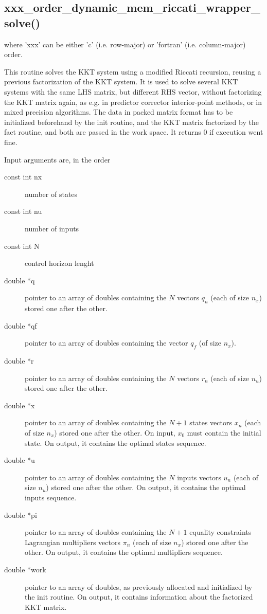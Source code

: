 \documentclass[a4paper]{report}
\begin{document}
\subsection{xxx\_order\_dynamic\_mem\_riccati\_wrapper\_solve() } 
where 'xxx' can be either 'c' (i.e. row-major) or 'fortran' (i.e. column-major) order.

This routine solves the KKT system using a modified Riccati recursion, reusing a previous factorization of the KKT system.
It is used to solve several KKT systems with the same LHS matrix, but different RHS vector, without factorizing the KKT matrix again, as e.g. in predictor corrector interior-point methods, or in mixed precision algorithms.
The data in packed matrix format has to be initialized beforehand by the init routine, and the KKT matrix factorized by the fact routine, and both are passed in the work space.
It returns 0 if execution went fine.

Input arguments are, in the order
\begin{description}
\item[const int nx] number of states
\item[const int nu] number of inputs
\item[const int N] control horizon lenght
\item[double *q] pointer to an array of doubles containing the $N$ vectors $q_n$ (each of size $n_x$) stored one after the other.
\item[double *qf] pointer to an array of doubles containing the vector $q_f$ (of size $n_x$).
\item[double *r] pointer to an array of doubles containing the $N$ vectors $r_n$ (each of size $n_u$) stored one after the other.
\item[double *x] pointer to an array of doubles containing the $N+1$ states vectors $x_n$ (each of size $n_x$) stored one after the other. On input, $x_0$ must contain the initial state. On output, it contains the optimal states sequence.
\item[double *u] pointer to an array of doubles containing the $N$ inputs vectors $u_n$ (each of size $n_u$) stored one after the other. On output, it contains the optimal inputs sequence.
\item[double *pi] pointer to an array of doubles containing the $N+1$ equality constraints Lagrangian multipliers vectors $\pi_n$ (each of size $n_x$) stored one after the other. On output, it contains the optimal multipliers sequence.
\item[double *work] pointer to an array of doubles, as previously allocated and initialized by the init routine. On output, it contains information about the factorized KKT matrix.
\end{description}
\end{document}
